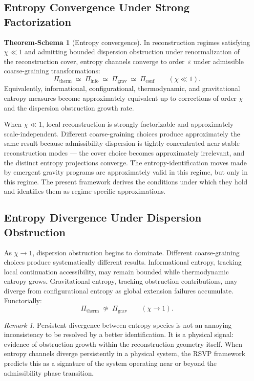 \documentclass[11pt, a4paper]{article}
\theoremstyle{plain}
\theoremstyle{definition}
\newtheorem{tschema}[theorem]{Theorem-Schema}
\theoremstyle{remark}
\newtheorem{remark}[theorem]{Remark}
\newcommand{\Pitherm}{\Pi_{\mathrm{therm}}}
\newcommand{\Piinfo}{\Pi_{\mathrm{info}}}
\newcommand{\Pigrav}{\Pi_{\mathrm{grav}}}
\newcommand{\Piconf}{\Pi_{\mathrm{conf}}}
\begin{document}
\subsection{Entropy Convergence Under Strong Factorization}

\begin{tschema}[Entropy convergence]
\label{ts:convergence}
In reconstruction regimes satisfying $\chi \ll 1$ and admitting bounded dispersion
obstruction under renormalization of the reconstruction cover, entropy channels
converge to order~$\varepsilon$ under admissible coarse-graining transformations:
\[
  \Pitherm \;\simeq\; \Piinfo \;\simeq\; \Pigrav \;\simeq\; \Piconf
  \qquad (\chi \ll 1).
\]
Equivalently, informational, configurational, thermodynamic, and gravitational
entropy measures become approximately equivalent up to corrections of order $\chi$
and the dispersion obstruction growth rate.
\end{tschema}

When $\chi \ll 1$, local reconstruction is strongly factorizable and approximately
scale-independent. Different coarse-graining choices produce approximately the same
result because admissibility dispersion is tightly concentrated near stable
reconstruction modes --- the cover choice becomes approximately irrelevant, and the
distinct entropy projections converge. The entropy-identification moves made by
emergent gravity programs are approximately valid in this regime, but only in this
regime. The present framework derives the conditions under which they hold and
identifies them as regime-specific approximations.

\subsection{Entropy Divergence Under Dispersion Obstruction}

As $\chi \to 1$, dispersion obstruction begins to dominate. Different coarse-graining
choices produce systematically different results. Informational entropy, tracking
local continuation accessibility, may remain bounded while thermodynamic entropy
grows. Gravitational entropy, tracking obstruction contributions, may diverge from
configurational entropy as global extension failures accumulate. Functorially:
\[
  \Pitherm \;\not\simeq\; \Pigrav
  \qquad (\chi \to 1).
\]

\begin{remark}
Persistent divergence between entropy species is not an annoying inconsistency to be
resolved by a better identification. It is a physical signal: evidence of obstruction
growth within the reconstruction geometry itself. When entropy channels diverge
persistently in a physical system, the RSVP framework predicts this as a signature
of the system operating near or beyond the admissibility phase transition.
\end{remark}
\end{document}
